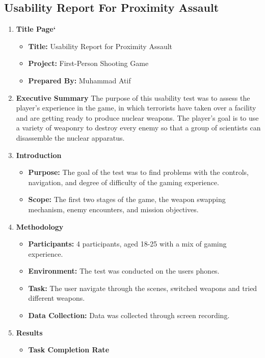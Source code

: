 \subsection{Usability Report For Proximity Assault}
\begin{enumerate}
	\item \textbf{Title Page`}
	\begin{itemize}
		\item \textbf{Title:} Usability Report for Proximity Assault
		\item \textbf{Project:} First-Person Shooting Game
		\item \textbf{Prepared By:} Muhammad Atif
	\end{itemize}
	\item \textbf{Executive Summary}
	The purpose of this usability test was to assess the player's experience in the game, in which terrorists have taken over a facility and are getting ready to produce nuclear weapons. The player's goal is to use a variety of weaponry to destroy every enemy so that a group of scientists can disassemble the nuclear apparatus.
	\item \textbf{Introduction}
	\begin{itemize}
		\item \textbf{Purpose:} The goal of the test was to find problems with the controls, navigation, and degree of difficulty of the gaming experience.
		\item \textbf{Scope:} The first two stages of the game, the weapon swapping mechanism, enemy encounters, and mission objectives.
	\end{itemize}
	\item \textbf{Methodology}
	\begin{itemize}
		\item \textbf{Participants:} 4 participants, aged 18-25 with a mix of gaming experience.
		\item \textbf{Environment:} The test was conducted on the users phones.
		\item \textbf{Task:} The user navigate through the scenes, switched weapons and tried different weapons.
		\item \textbf{Data Collection:} Data was collected through screen recording.
	\end{itemize}
	\item \textbf{Results}
	\begin{itemize}
		\item \textbf{Task Completion Rate}
		\begin{table}[h]

\end{table}
\end{itemize}
\end{enumerate}
